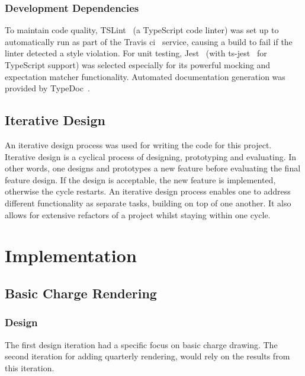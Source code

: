 \documentclass[nobib, a4paper, twoside, justified]{tufte-book}
\makeatletter
\newcommand{\charge}{\gls{charge}\@\xspace}
\makeatother
\begin{document}
\subsection{Development Dependencies}%
\label{sub:development_dependencies}

To maintain code quality, TSLint~\autocite{tslint} (a TypeScript code linter) was set up to
automatically run as part of the Travis \gls{ci}~\autocite{travis} service, causing a build to fail
if the linter detected a style violation. For unit testing, Jest~\autocite{jest} (with
ts-jest~\autocite{ts-jest} for TypeScript support) was selected especially for its powerful mocking
and expectation matcher functionality. Automated documentation generation was provided by
TypeDoc~\autocite{typedoc}.

\section{Iterative Design}%
\label{sec:iterative_design}

An iterative design process was used for writing the code for this project. Iterative design is a
cyclical process of designing, prototyping and evaluating. In other words, one designs and
prototypes a new feature before evaluating the final feature design. If the design is acceptable,
the new feature is implemented, otherwise the cycle restarts. An iterative design process enables
one to address different functionality as separate tasks, building on top of one another. It also
allows for extensive refactors of a project whilst staying within one cycle.

\chapter{Implementation}%
\label{cha:implementation}

\section{Basic Charge Rendering}%
\label{sub:basic_charge_rendering}

\subsection{Design}%
\label{sub:first_design_iteration}

The first design iteration had a specific focus on basic \charge drawing.  The second iteration for
adding quarterly rendering, would rely on the results from this iteration.
\end{document}
